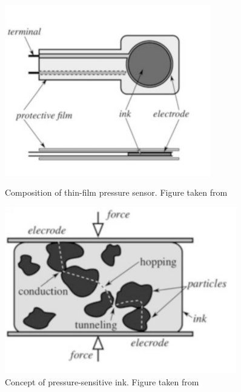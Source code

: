 \begin{figure}[!htb]
   \begin{minipage}{0.470\textwidth}
     \centering
     \includegraphics[width=0.8\textwidth]{figures/sensorconstruction.png}
     \caption{Composition of thin-film pressure sensor. Figure taken from \cite[p.418]{handbook}}
     \label{fig:sensorconstruction}
   \end{minipage}\hfill
   \begin{minipage}{0.475\textwidth}
     \centering
     \includegraphics[width=0.9\textwidth]{figures/sensorconcept.png}
     \caption{Concept of pressure-sensitive ink. Figure taken from \cite[p.418]{handbook}}
     \label{fig:sensorconcept}
   \end{minipage}
\end{figure}

